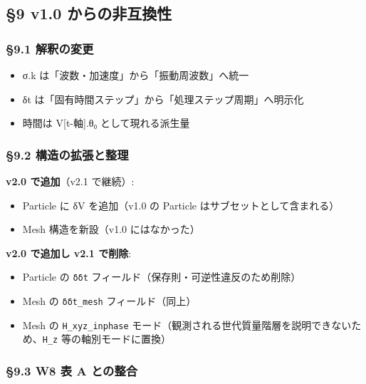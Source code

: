 \documentclass[a4paper,11pt]{ltjsarticle}
\providecommand{\tightlist}{\setlength{\itemsep}{0pt}\setlength{\parskip}{0pt}}
\begin{document}
\subsection{§9 v1.0
からの非互換性}\label{v1.0-ux304bux3089ux306eux975eux4e92ux63dbux6027}

\subsubsection{§9.1 解釈の変更}\label{ux89e3ux91c8ux306eux5909ux66f4}

\begin{itemize}
\tightlist
\item
  σ.k は「波数・加速度」から「振動周波数」へ統一
\item
  δt は「固有時間ステップ」から「処理ステップ周期」へ明示化
\item
  時間は V{[}t-軸{]}.θ₀ として現れる派生量
\end{itemize}

\subsubsection{§9.2
構造の拡張と整理}\label{ux69cbux9020ux306eux62e1ux5f35ux3068ux6574ux7406}

\textbf{v2.0 で追加}（v2.1 で継続）:

\begin{itemize}
\tightlist
\item
  Particle に δV を追加（v1.0 の Particle はサブセットとして含まれる）
\item
  Mesh 構造を新設（v1.0 にはなかった）
\end{itemize}

\textbf{v2.0 で追加し v2.1 で削除}:

\begin{itemize}
\tightlist
\item
  Particle の \texttt{δδt} フィールド（保存則・可逆性違反のため削除）
\item
  Mesh の \texttt{δδt\_mesh} フィールド（同上）
\item
  Mesh の \texttt{H\_xyz\_inphase}
  モード（観測される世代質量階層を説明できないため、\texttt{H\_z}
  等の軸別モードに置換）
\end{itemize}

\subsubsection{§9.3 W8 表 A
との整合}\label{w8-ux8868-a-ux3068ux306eux6574ux5408}
\end{document}
